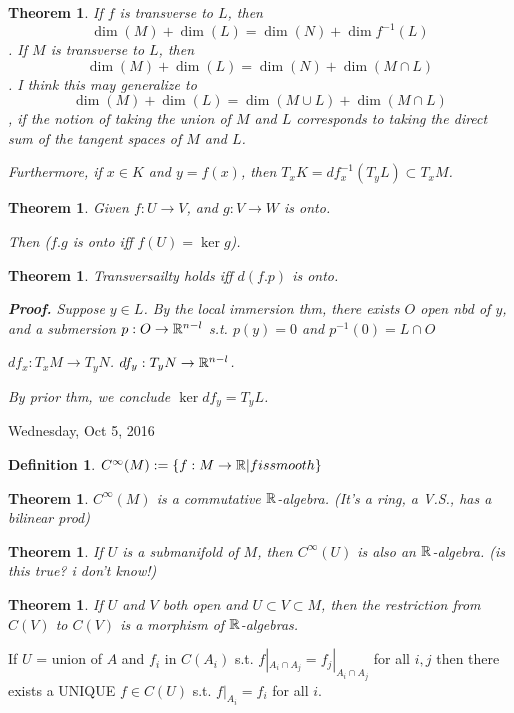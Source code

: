 \documentclass[11pt,leqno,oneside]{amsart}
\theoremstyle{mystyle} \newtheorem{thrm}[thm]{Theorem}
\theoremstyle{mystyle} \newtheorem{defi}[thm]{Definition}
\begin{document}
\begin{thrm}
	If $f$ is transverse to $L$, then $$\dim(M) + \dim(L) = \dim(N) + \dim f^{-1}(L)$$.
	If $M$ is transverse to $L$, then $$\dim(M) + \dim(L) = \dim(N) + \dim(M \cap L)$$.
	I think this may generalize to $$\dim(M) + \dim(L) = \dim(M \cup L) + \dim(M \cap L)$$, if the notion of taking the union of $M$ and $L$ corresponds to taking the direct sum of the tangent spaces of $M$ and $L$.

	Furthermore, if $x \in K$ and $y = f(x)$, then $T_x K = df^{-1}_x(T_y L) \subset T_x M$.
\end{thrm}

\begin{thrm}
	Given $f : U \to V$, and
	$g : V \to W$ is onto.

	Then ($f.g$ is onto iff $f(U) = \ker g$).
\end{thrm}

\begin{thrm}
	Transversailty holds iff $d(f.p)$ is onto.

	\textbf{Proof.}
	Suppose $y \in L$.
	By the local immersion thm,
	there exists $O$ open nbd of $y$, and a submersion $p : O \to {\mathbb R}^{n-l}$
	s.t. $p(y) = 0$ and $p^{-1}(0) = L \cap O$

	$df_x : T_xM \to T_yN$.
	$df_y : T_yN \to {\mathbb R}^{n-l}$.

	By prior thm, we conclude $\ker df_y = T_yL$.
\end{thrm}

Wednesday, Oct 5, 2016

\begin{defi}
	$C^\infty(M) := \{ f:M \to {\mathbb R} | f is smooth \}$
\end{defi}
\begin{thrm}
	$C^\infty(M)$ is a commutative ${\mathbb R}$-algebra. (It's a ring, a V.S., has a bilinear prod)
\end{thrm}
\begin{thrm}
	If $U$ is a submanifold of $M$, then $C^\infty(U)$ is also an ${\mathbb R}$-algebra.
	(is this true?  i don't know!)
\end{thrm}
\begin{thrm}
	If $U$ and $V$ both open and $U \subset V \subset M$, then
	the restriction from $C(V)$ to $C(V)$ is a morphism of ${\mathbb R}$-algebras.
\end{thrm}
\begin{prop}
	If $U$ = union of $A$
	and $f_i$ in $C(A_i)$ s.t. $f|_{A_i \cap A_j} = f_j|_{A_i \cap A_j}$ for all $i, j$
	then there exists a UNIQUE $f \in C(U)$ s.t. $f|_{A_i} = f_i$ for all $i$.
\end{prop}
\end{document}
